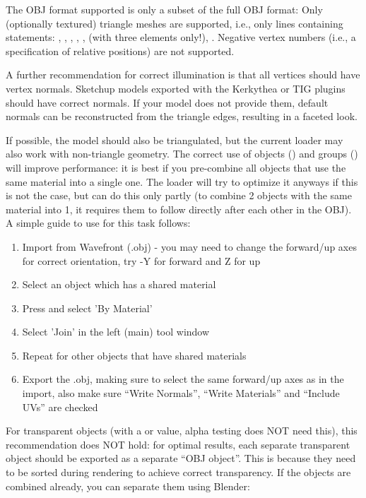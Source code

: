 The OBJ format supported is only a subset of the full OBJ format: Only
(optionally textured) triangle meshes are supported, i.e., only lines containing
statements: , , , , , 
(with three elements only!), . Negative vertex numbers (i.e., a
specification of relative positions) are not supported.

A further recommendation for correct illumination is that all vertices should
have vertex normals. Sketchup models exported with the Kerkythea or TIG plugins
should have correct normals. If your model does not provide them, default
normals can be reconstructed from the triangle edges, resulting in a faceted
look.

If possible, the model should also be triangulated, but the current loader may
also work with non-triangle geometry. 
The correct use of objects () and
groups () will improve performance: it is best if you pre-combine all objects
that use the same material into a single one. The loader will try to optimize it
anyways if this is not the case, but can do this only partly (to combine 2
objects with the same material into 1, it requires them to follow directly after
each other in the OBJ). A simple guide to use  for this task follows:

\begin{enumerate}
\item Import from Wavefront (.obj) - you may need to change the forward/up axes for correct orientation, try -Y for forward and Z for up
\item Select an object which has a shared material
\item Press  and select 'By Material'
\item Select 'Join' in the left (main) tool window
\item Repeat for other objects that have shared materials
\item Export the .obj, making sure to select the same forward/up axes as in the import, also make sure ``Write Normals'', ``Write Materials'' and ``Include UVs'' are checked
\end{enumerate}

\noindent For transparent objects (with a  or  value, alpha testing does
NOT need this), this recommendation does NOT hold: for optimal
results, each separate transparent object should be exported as a
separate ``OBJ object''. This is because they need to be sorted during
rendering to achieve correct transparency. If the objects are combined
already, you can separate them using Blender:

